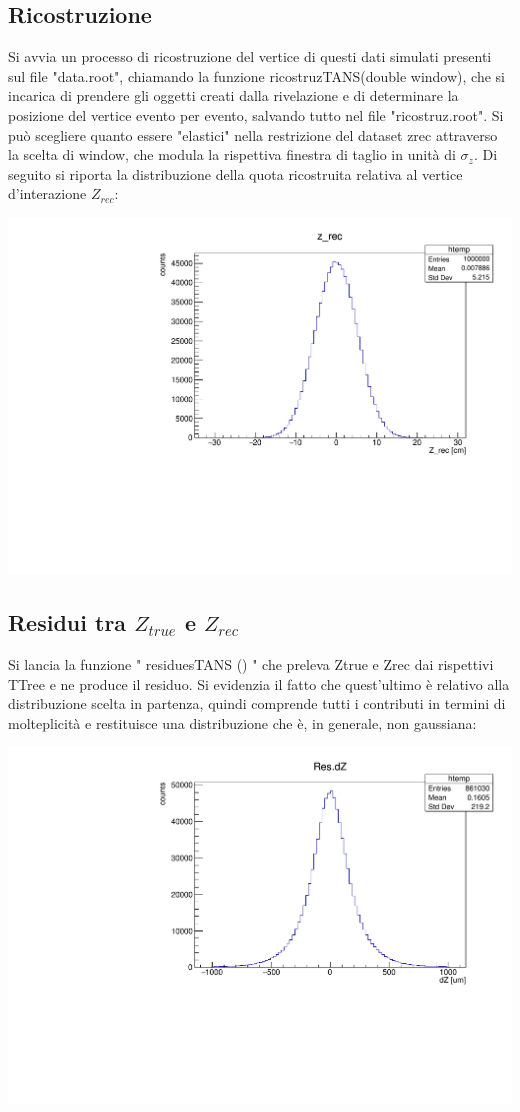 \documentclass{article}
\begin{document}
\subsection{Ricostruzione}
Si avvia un processo di ricostruzione del vertice di questi dati simulati presenti sul file "data.root", chiamando la funzione ricostruz\textunderscore TANS(double window), che si incarica di prendere gli oggetti creati dalla rivelazione e di determinare la posizione del vertice evento per evento, salvando tutto nel file "ricostruz.root". Si può scegliere quanto essere "elastici" nella restrizione del dataset z\textunderscore rec attraverso la scelta di window, che modula la rispettiva finestra di taglio in unità di $\sigma_z$. Di seguito si riporta la distribuzione della quota ricostruita relativa al vertice d'interazione $Z_{rec}$:

\begin{center}
    	\includegraphics[width=0.55\linewidth]{images/R_z_rec.pdf}
\end{center}

\subsection{Residui tra $Z_{true}$ e $Z_{rec}$}
Si lancia la funzione " residues\textunderscore TANS () " che preleva Z\textunderscore true e Z\textunderscore rec dai rispettivi TTree e ne produce il residuo. Si evidenzia il fatto che quest'ultimo è relativo alla distribuzione scelta in partenza, quindi comprende tutti i contributi in termini di molteplicità e restituisce una distribuzione che è, in generale, non gaussiana:
\begin{center}
    	\includegraphics[width=0.65\linewidth]{images/res_dz.pdf}
\end{center}
\end{document}
